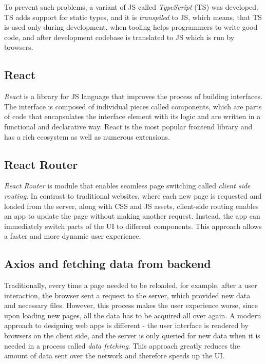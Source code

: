 To prevent such problems, a variant of JS called \emph{TypeScript} (TS) was developed. TS adds support for static types, and it is \emph{transpiled} to JS, which means, that TS is used only during development, when tooling helps programmers to write good code, and after development codebase is translated to JS which is run by browsers. \cite{typescript}

\subsection{React}

\emph{React} is a library for JS language that improves the process of building interfaces. The interface is composed of individual pieces called components, which are parts of code that encapsulates the interface element with its logic and are written in a functional and declarative way. React is the most popular frontend library and has a rich ecosystem as well as numerous extensions.\cite{react_dev}

\subsection{React Router}

\emph{React Router} is module that enables seamless page switching called \emph{client side routing}. In contrast to traditional websites, where each new page is requested and loaded from the server, along with CSS and JS assets, client-side routing enables an app to update the page without making another request. Instead, the app can immediately switch parts of the UI to different components. This approach allows a faster and more dynamic user experience. \cite{react_router}

\subsection{Axios and fetching data from backend}

Traditionally, every time a page needed to be reloaded, for example, after a user interaction, the browser sent a request to the server, which provided new data and necessary files. However, this process makes the user experience worse, since upon loading new pages, all the data has to be acquired all over again. A modern approach to designing web apps is different - the user interface is rendered by browsers on the client side, and the server is only queried for new data when it is needed in a process called \emph{data fetching}. This approach greatly reduces the amount of data sent over the network and therefore speeds up the UI.

